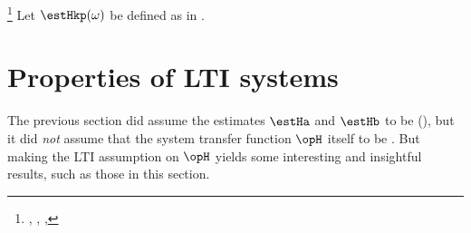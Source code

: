 \begin{proposition}
\footnote{
  ,
  ,
  ,
  }
\label{prop:Hs}
Let $\estHkp(\omega)$ be defined as in .
\end{proposition}




\section{Properties of LTI systems}
The previous section did assume the estimates $\estHa$ and $\estHb$  to be 
 (), but it did \emph{not} assume that 
the system transfer function $\opH$ itself to be . 
But making the LTI assumption on $\opH$ yields some interesting and insightful
results, such as those in this section.

